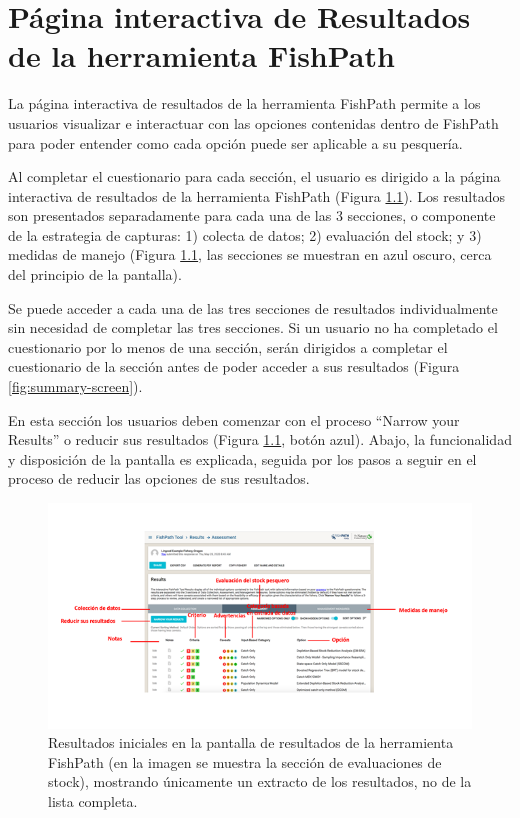 \documentclass[
  11pt,
]{book}
\begin{document}
\hypertarget{puxe1gina-interactiva-de-resultados-de-la-herramienta-fishpath}{%
\chapter{Página interactiva de Resultados de la herramienta FishPath}\label{puxe1gina-interactiva-de-resultados-de-la-herramienta-fishpath}}

La página interactiva de resultados de la herramienta FishPath permite a los usuarios visualizar e interactuar con las opciones contenidas dentro de FishPath para poder entender como cada opción puede ser aplicable a su pesquería.

Al completar el cuestionario para cada sección, el usuario es dirigido a la página interactiva de resultados de la herramienta FishPath (Figura \ref{fig:results-overview}). Los resultados son presentados separadamente para cada una de las 3 secciones, o componente de la estrategia de capturas: 1) colecta de datos; 2) evaluación del stock; y 3) medidas de manejo (Figura \ref{fig:results-overview}, las secciones se muestran en azul oscuro, cerca del principio de la pantalla).

Se puede acceder a cada una de las tres secciones de resultados individualmente sin necesidad de completar las tres secciones. Si un usuario no ha completado el cuestionario por lo menos de una sección, serán dirigidos a completar el cuestionario de la sección antes de poder acceder a sus resultados (Figura \ref{fig:summary-screen}).

En esta sección los usuarios deben comenzar con el proceso ``Narrow your Results'' o reducir sus resultados (Figura \ref{fig:results-overview}, botón azul). Abajo, la funcionalidad y disposición de la pantalla es explicada, seguida por los pasos a seguir en el proceso de reducir las opciones de sus resultados.

\begin{figure}

{\centering \includegraphics[width=0.95\linewidth]{images/results-overview-es} 

}

\caption{Resultados iniciales en la pantalla de resultados de la herramienta FishPath (en la imagen se muestra la sección de evaluaciones de stock), mostrando únicamente un extracto de los resultados, no de la lista completa.}\label{fig:results-overview}
\end{figure}
\end{document}
